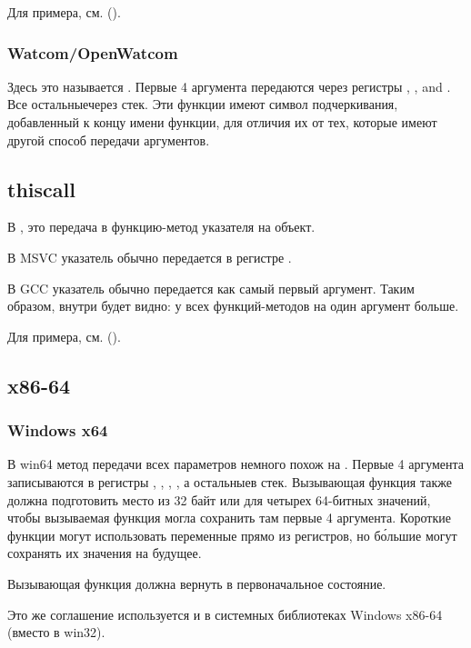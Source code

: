 Для примера, см. ().

\subsubsection{Watcom/OpenWatcom}

Здесь это называется .
Первые 4 аргумента передаются через регистры
\EAX, \EDX, \EBX and \ECX.
Все остальные\EMDASH{}через стек.
Эти функции имеют символ подчеркивания, добавленный к концу имени функции, для отличия их от тех,
которые имеют другой способ передачи аргументов.

\subsection{thiscall}

В \Cpp, это передача в функцию-метод указателя \ITthis на объект.

В MSVC указатель \ITthis обычно передается в регистре \ECX.

В GCC указатель \ITthis обычно передается как самый первый аргумент. 
Таким образом, внутри будет видно: у всех функций-методов на один аргумент больше.

Для примера, см. ().

\subsection{x86-64}

\subsubsection{Windows x64}
\label{sec:callingconventions_win64}

В win64 метод передачи всех параметров немного похож на . 
Первые 4 аргумента записываются в регистры \RCX, \RDX, , , а остальные\EMDASH{}в стек. 
Вызывающая функция также должна подготовить место из 32 байт или для четырех 64-битных значений, 
чтобы вызываемая функция могла сохранить там первые 4 аргумента. 
Короткие функции могут использовать переменные прямо из регистров, 
но б\'{о}льшие могут сохранять их значения на будущее.

Вызывающая функция должна вернуть  
в первоначальное состояние.

Это же соглашение используется и в системных библиотеках Windows x86-64 
(вместо  в win32).

